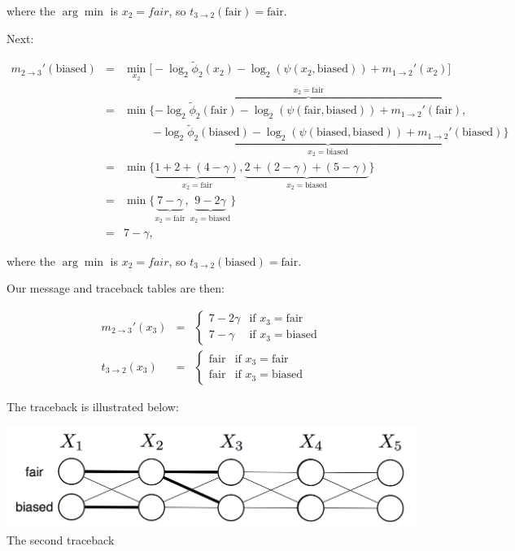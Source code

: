 \documentclass[6008notes.tex]{subfiles}
\begin{document}
where the $\arg \min$ is $x_2=fair$, so $t_{3\rightarrow 2}(\text {fair}) = \text {fair}$.

Next:

\begin{eqnarray*}
m_{2\rightarrow 3}'(\text{biased})
&=& \min_{x_2}
      \big[ -\log_2\widetilde\phi_2(x_2) - \log_2(\psi(x_2, \text{biased}))
            + m_{1\rightarrow 2}'(x_2) \big] \\
&=& \min
      \big\{
        \overbrace{-\log_2\widetilde\phi_2(\text{fair})
          - \log_2(\psi(\text{fair}, \text{biased}))
          + m_{1\rightarrow 2}'(\text{fair})}^{x_2 = \text{fair}}, \\
&&\qquad\;\;
        \underbrace{-\log_2\widetilde\phi_2(\text{biased})
          - \log_2(\psi(\text{biased}, \text{biased}))
          + m_{1\rightarrow 2}'(\text{biased})}_{x_2 = \text{biased}}
      \big\} \\
&=& \min
      \big\{
        \underbrace{1 + 2 + (4 - \gamma)}_{x_2 = \text{fair}},
        \underbrace{2 + (2 - \gamma) + (5 - \gamma)}_{x_2 = \text{biased}}
      \big\} \\
&=& \min
      \big\{
        \underbrace{7 - \gamma}_{x_2 = \text{fair}},
        \underbrace{9 - 2\gamma}_{x_2 = \text{biased}}
      \big\} \\
&=& 7 - \gamma,
\end{eqnarray*}

where the $\arg \min$ is $x_2=fair$, so $t_{3\rightarrow 2}(\text {biased}) = \text {fair}$.

Our message and traceback tables are then:

\begin{eqnarray*}
m_{2 \rightarrow 3}'(x_3)
&=& \begin{cases}
      7-2\gamma & \text{if }x_3 = \text{fair} \\
      7-\gamma & \text{if }x_3 = \text{biased}
    \end{cases} \\
t_{3 \rightarrow 2}(x_3)
&=& \begin{cases}
      \text{fair} & \text{if }x_3 = \text{fair} \\
      \text{fair} & \text{if }x_3 = \text{biased}
    \end{cases}
\end{eqnarray*}

The traceback is illustrated below:

{\centering\includegraphics[scale=0.3]{images_sec-viterbi-trellis3}\\
The second traceback \par}
\end{document}
